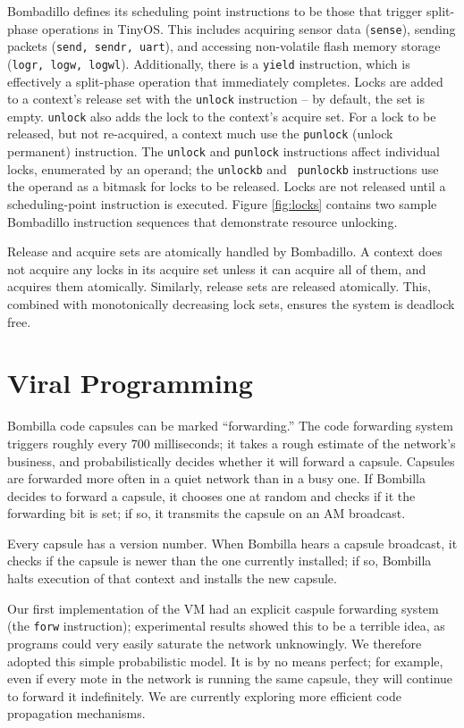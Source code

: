 \documentclass[10pt]{article}
\begin{document}
Bombadillo defines its scheduling point instructions to be those that
trigger split-phase operations in TinyOS. This includes acquiring
sensor data ({\tt sense}), sending packets ({\tt send, sendr, uart}),
and accessing non-volatile flash memory storage ({\tt logr, logw,
logwl}). Additionally, there is a {\tt yield} instruction, which is
effectively a split-phase operation that immediately completes. Locks
are added to a context's release set with the {\tt unlock} instruction
-- by default, the set is empty. {\tt unlock} also adds the lock to
the context's acquire set. For a lock to be released, but not
re-acquired, a context much use the {\tt punlock} (unlock permanent)
instruction. The {\tt unlock} and {\tt punlock} instructions affect
individual locks, enumerated by an operand; the {\tt unlockb} and {\tt
punlockb} instructions use the operand as a bitmask for locks to be
released. Locks are not released until a scheduling-point instruction
is executed. Figure \ref{fig:locks} contains two sample Bombadillo
instruction sequences that demonstrate resource unlocking.

Release and acquire sets are atomically handled by Bombadillo. A
context does not acquire any locks in its acquire set unless it can
acquire all of them, and acquires them atomically. Similarly, release
sets are released atomically. This, combined with monotonically
decreasing lock sets, ensures the system is deadlock free.

\section{Viral Programming}
\label{sec:viral}

Bombilla code capsules can be marked ``forwarding.'' The code
forwarding system triggers roughly every 700 milliseconds; it takes a
rough estimate of the network's business, and probabilistically
decides whether it will forward a capsule. Capsules are forwarded more
often in a quiet network than in a busy one. If Bombilla decides to
forward a capsule, it chooses one at random and checks if it the
forwarding bit is set; if so, it transmits the capsule on an AM
broadcast.

Every capsule has a version number. When Bombilla hears a capsule
broadcast, it checks if the capsule is newer than the one currently
installed; if so, Bombilla halts execution of that context and
installs the new capsule.

Our first implementation of the VM had an explicit caspule forwarding
system (the {\tt forw} instruction); experimental results showed this
to be a terrible idea, as programs could very easily saturate the
network unknowingly. We therefore adopted this simple probabilistic
model. It is by no means perfect; for example, even if every mote in
the network is running the same capsule, they will continue to forward
it indefinitely. We are currently exploring more efficient code
propagation mechanisms.
\end{document}
